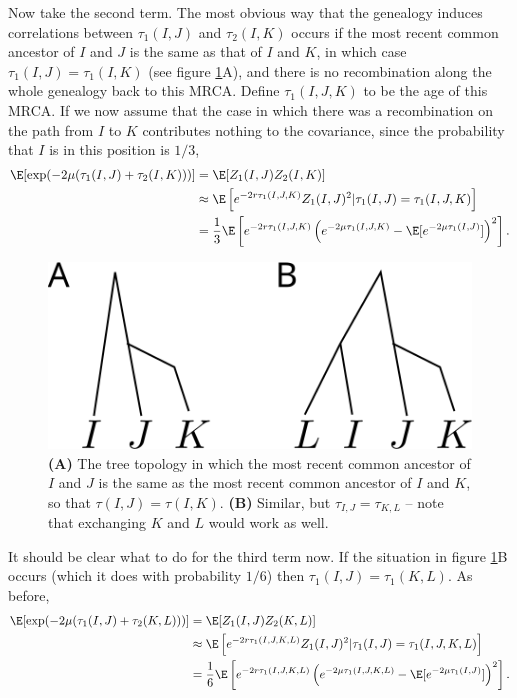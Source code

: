 Now take the second term.
The most obvious way that the genealogy induces correlations between $\tau_1(I,J)$ and $\tau_2(I,K)$
occurs if the most recent common ancestor of $I$ and $J$ is the same as that of $I$ and $K$,
in which case $\tau_1(I,J) = \tau_1(I,K)$ (see figure \ref{fig:coal_time_correlation}A),
and there is no recombination along the whole genealogy back to this MRCA.
Define $\tau_1(I,J,K)$ to be the age of this MRCA.
If we now assume that the case in which there was a recombination on the path from $I$ to $K$ contributes nothing to the covariance,
since the probability that $I$ is in this position is $1/3$,
\begin{align}
  \E[ \exp(-2\mu(\tau_1(I,J)+\tau_2(I,K))) ] &= \E[ Z_1(I,J) Z_2(I,K) ] \\
  &\approx \E \left[ e^{-2r \tau_1(I,J,K)} Z_1(I,J)^2 \vert \tau_1(I,J) = \tau_1(I,J,K)  \right] \\
  &= \frac{1}{3} \E \left[ e^{-2r \tau_1(I,J,K)} \left( e^{-2\mu \tau_1(I,J,K)} - \E[e^{-2\mu \tau_1(I,J)}] \right)^2 \right] .
\end{align}


\begin{figure}[ht!]
  \begin{center}
    \includegraphics{coal-time-correlation}
  \end{center}
  \caption{
    \textbf{(A)} The tree topology in which the most recent common ancestor of $I$ and $J$ 
    is the same as the most recent common ancestor of $I$ and $K$, so that $\tau(I,J) = \tau(I,K)$.
    \textbf{(B)} Similar, but $\tau_{I,J} = \tau_{K,L}$ -- note that exchanging $K$ and $L$ would work as well.
    \label{fig:coal_time_correlation}
  }
\end{figure}

It should be clear what to do for the third term now.
If the situation in figure \ref{fig:coal_time_correlation}B occurs (which it does with probability $1/6$)
then $\tau_1(I,J) = \tau_1(K,L)$.
As before,
\begin{align}
  \E[ \exp(-2\mu(\tau_1(I,J)+\tau_2(K,L))) ] &= \E[ Z_1(I,J) Z_2(K,L) ] \\
  &\approx \E \left[ e^{-2r \tau_1(I,J,K,L)} Z_1(I,J)^2 \vert \tau_1(I,J) = \tau_1(I,J,K,L)  \right] \\
  &= \frac{1}{6} \E \left[ e^{-2r \tau_1(I,J,K,L)} \left( e^{-2\mu \tau_1(I,J,K,L)} - \E[e^{-2\mu \tau_1(I,J)}] \right)^2 \right] .
\end{align}

